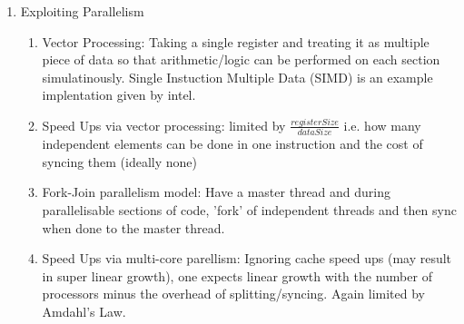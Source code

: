 \documentclass[12pt]{article}
\renewcommand{\=}[1]{\stackrel{#1}{=}} %
\theoremstyle{definition}
\theoremstyle{remark}
\begin{document}
\begin{enumerate}
  \item Exploiting Parallelism
    \begin{enumerate}
    \item Vector Processing: Taking a single register and treating it
      as multiple piece of data so that arithmetic/logic can be performed on
      each section simulatinously. Single Instuction Multiple Data
      (SIMD) is an example implentation given by intel.
    \item Speed Ups via vector processing: limited by $\frac{register
      Size}{dataSize}$ i.e. how many independent elements can be done
      in one instruction and the cost of syncing them (ideally none)
    \item Fork-Join parallelism model: Have a master thread and during
      parallelisable sections of code, 'fork' of independent threads
      and then sync when done to the master thread.
    \item Speed Ups via multi-core parellism: Ignoring cache speed
      ups (may result in super linear growth), one expects linear
      growth with the number of processors minus the overhead of
      splitting/syncing. Again limited by Amdahl's Law.
    \end{enumerate}

  \end{enumerate}
\end{document}
